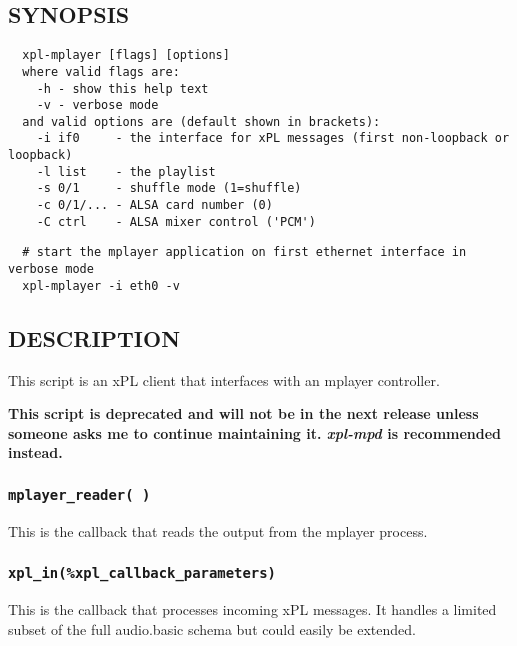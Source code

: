 \documentclass[12pt,a4paper]{article}
\begin{document}
\subsection*{SYNOPSIS\label{xpl-mplayer_SYNOPSIS}}
\begin{verbatim}
  xpl-mplayer [flags] [options]
  where valid flags are:
    -h - show this help text
    -v - verbose mode
  and valid options are (default shown in brackets):
    -i if0     - the interface for xPL messages (first non-loopback or loopback)
    -l list    - the playlist
    -s 0/1     - shuffle mode (1=shuffle)
    -c 0/1/... - ALSA card number (0)
    -C ctrl    - ALSA mixer control ('PCM')
\end{verbatim}
\begin{verbatim}
  # start the mplayer application on first ethernet interface in verbose mode
  xpl-mplayer -i eth0 -v
\end{verbatim}
\subsection*{DESCRIPTION\label{xpl-mplayer_DESCRIPTION}}


This script is an xPL client that interfaces with an mplayer controller.



\textbf{This script is deprecated and will not be in the next release unless
someone asks me to continue maintaining it.  \emph{xpl-mpd} is recommended
instead.}

\subsubsection*{\texttt{mplayer\_reader( )}\label{xpl-mplayer_mplayer_reader_}}


This is the callback that reads the output from the mplayer process.

\subsubsection*{\texttt{xpl\_in(\%xpl\_callback\_parameters)}\label{xpl-mplayer_xpl_in_xpl_callback_parameters_}}


This is the callback that processes incoming xPL messages.  It handles
a limited subset of the full audio.basic schema but could easily be
extended.
\end{document}
